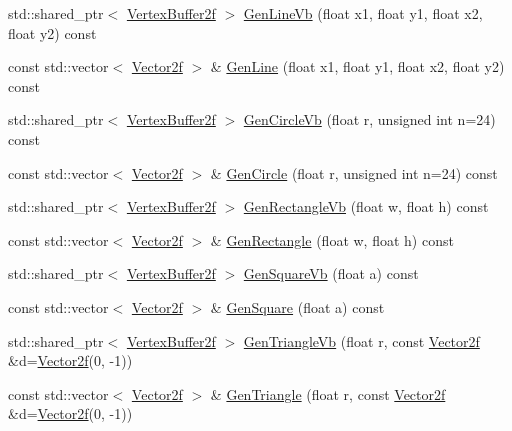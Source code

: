 \begin{DoxyCompactItemize}
std\+::shared\+\_\+ptr$<$ \hyperlink{group__gfx__group_ga081cf45a441eef100dfbb1e0f64c3826}{Vertex\+Buffer2f} $>$ \hyperlink{classastu_1_1suite2d_1_1ShapeGenerator_aaed9d207daf5a4a2943c494f8a69259b}{Gen\+Line\+Vb} (float x1, float y1, float x2, float y2) const
\item 
const std\+::vector$<$ \hyperlink{classastu_1_1Vector2}{Vector2f} $>$ \& \hyperlink{classastu_1_1suite2d_1_1ShapeGenerator_a902ee3986ee54a357e449004d8504e23}{Gen\+Line} (float x1, float y1, float x2, float y2) const
\item 
std\+::shared\+\_\+ptr$<$ \hyperlink{group__gfx__group_ga081cf45a441eef100dfbb1e0f64c3826}{Vertex\+Buffer2f} $>$ \hyperlink{classastu_1_1suite2d_1_1ShapeGenerator_a3b9a8e17a85ae7ba4ac40c40de8074d6}{Gen\+Circle\+Vb} (float r, unsigned int n=24) const
\item 
const std\+::vector$<$ \hyperlink{classastu_1_1Vector2}{Vector2f} $>$ \& \hyperlink{classastu_1_1suite2d_1_1ShapeGenerator_a5d608ccbe9df8bf25d5b044147d9f699}{Gen\+Circle} (float r, unsigned int n=24) const
\item 
std\+::shared\+\_\+ptr$<$ \hyperlink{group__gfx__group_ga081cf45a441eef100dfbb1e0f64c3826}{Vertex\+Buffer2f} $>$ \hyperlink{classastu_1_1suite2d_1_1ShapeGenerator_a4430884bf8387a304ef97a5ab3f3b217}{Gen\+Rectangle\+Vb} (float w, float h) const
\item 
const std\+::vector$<$ \hyperlink{classastu_1_1Vector2}{Vector2f} $>$ \& \hyperlink{classastu_1_1suite2d_1_1ShapeGenerator_acfc3b5e95ba9680ed33988b65bb4a36a}{Gen\+Rectangle} (float w, float h) const
\item 
std\+::shared\+\_\+ptr$<$ \hyperlink{group__gfx__group_ga081cf45a441eef100dfbb1e0f64c3826}{Vertex\+Buffer2f} $>$ \hyperlink{classastu_1_1suite2d_1_1ShapeGenerator_a8f60eae937399f59d2ff2be56f91a6cd}{Gen\+Square\+Vb} (float a) const
\item 
const std\+::vector$<$ \hyperlink{classastu_1_1Vector2}{Vector2f} $>$ \& \hyperlink{classastu_1_1suite2d_1_1ShapeGenerator_ae75b45a6f4d2d1512bfc43138f485870}{Gen\+Square} (float a) const
\item 
std\+::shared\+\_\+ptr$<$ \hyperlink{group__gfx__group_ga081cf45a441eef100dfbb1e0f64c3826}{Vertex\+Buffer2f} $>$ \hyperlink{classastu_1_1suite2d_1_1ShapeGenerator_a2be269018caaf6abb76dfb01efccfb1f}{Gen\+Triangle\+Vb} (float r, const \hyperlink{classastu_1_1Vector2}{Vector2f} \&d=\hyperlink{classastu_1_1Vector2}{Vector2f}(0, -\/1))
\item 
const std\+::vector$<$ \hyperlink{classastu_1_1Vector2}{Vector2f} $>$ \& \hyperlink{classastu_1_1suite2d_1_1ShapeGenerator_a4a0a3b20943d68839fa8ec9153c6c8fe}{Gen\+Triangle} (float r, const \hyperlink{classastu_1_1Vector2}{Vector2f} \&d=\hyperlink{classastu_1_1Vector2}{Vector2f}(0, -\/1))

\end{DoxyCompactItemize}
